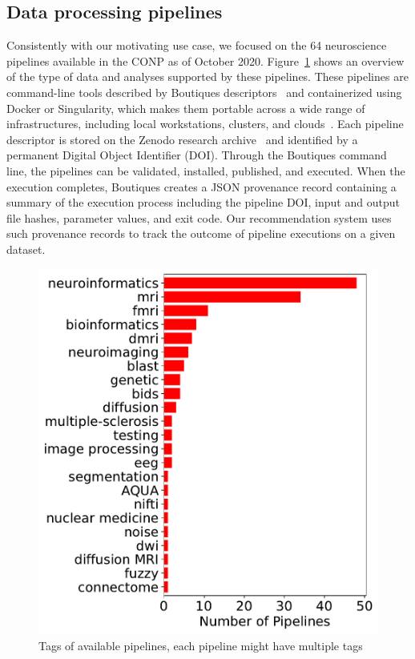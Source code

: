 \documentclass[conference]{IEEEtran}
\begin{document}
\subsection{Data processing pipelines} 
Consistently with our motivating use case, we focused on the 64
neuroscience pipelines available in the CONP as of October
2020. Figure~\ref{fig:pipelines_tags} shows an overview of the type of data
and analyses supported by these pipelines. These pipelines are command-line
tools described by Boutiques descriptors~\cite{glatard2018boutiques} and
containerized using Docker or Singularity, which makes them portable across
a wide range of infrastructures, including local workstations, clusters,
and clouds~\cite{kiar2019serverless}. Each pipeline descriptor is stored on
the Zenodo research archive~\cite{zenodo} and identified by a permanent Digital Object
Identifier (DOI). Through the Boutiques command line, the pipelines can be
validated, installed, published, and executed. When the execution
completes, Boutiques creates a JSON provenance record containing a summary
of the execution process including the pipeline DOI, input and output file
hashes, parameter values, and exit code. Our recommendation system uses
such provenance records to track the outcome of pipeline executions on a
given dataset.
\begin{figure} 
  \includegraphics[width=\columnwidth]{figures/Pipelines Tag.pdf}
  \caption{Tags of available pipelines, each pipeline might have multiple tags}
  \label{fig:pipelines_tags}
\end{figure}
\end{document}
